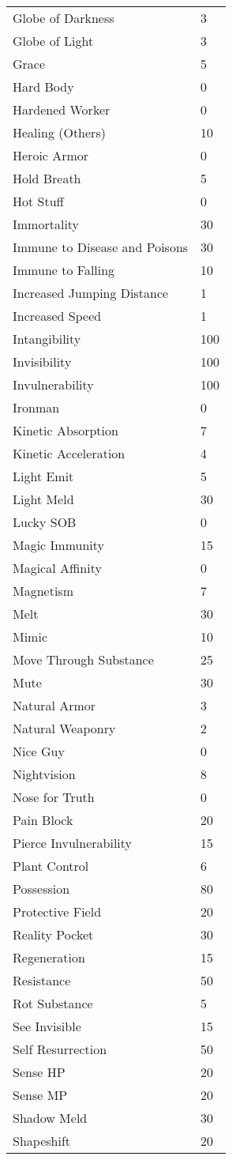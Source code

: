 \documentclass[twoside]{book}
\begin{document}
\begin{longtable}{p{1.25in}l}
      \raggedright  Globe of Darkness& 3\tabularnewline
      \raggedright  Globe of Light& 3\tabularnewline
      \raggedright  Grace& 5\tabularnewline
      \raggedright  Hard Body& 0\tabularnewline
      \raggedright  Hardened Worker& 0\tabularnewline
      \raggedright  Healing (Others)& 10\tabularnewline
      \raggedright  Heroic Armor& 0\tabularnewline
      \raggedright  Hold Breath& 5\tabularnewline
      \raggedright  Hot Stuff& 0\tabularnewline
      \raggedright  Immortality& 30\tabularnewline
      \raggedright  Immune to Disease and Poisons& 30\tabularnewline
      \raggedright  Immune to Falling& 10\tabularnewline
      \raggedright  Increased Jumping Distance& 1\tabularnewline
      \raggedright  Increased Speed& 1\tabularnewline
      \raggedright  Intangibility& 100\tabularnewline
      \raggedright  Invisibility& 100\tabularnewline
      \raggedright  Invulnerability& 100\tabularnewline
      \raggedright  Ironman& 0\tabularnewline
      \raggedright  Kinetic Absorption& 7\tabularnewline
      \raggedright  Kinetic Acceleration& 4\tabularnewline
      \raggedright  Light Emit& 5\tabularnewline
      \raggedright  Light Meld& 30\tabularnewline
      \raggedright  Lucky SOB& 0\tabularnewline
      \raggedright  Magic Immunity& 15\tabularnewline
      \raggedright  Magical Affinity& 0\tabularnewline
      \raggedright  Magnetism& 7\tabularnewline
      \raggedright  Melt& 30\tabularnewline
      \raggedright  Mimic& 10\tabularnewline
      \raggedright  Move Through Substance& 25\tabularnewline
      \raggedright  Mute& 30\tabularnewline
      \raggedright  Natural Armor& 3\tabularnewline
      \raggedright  Natural Weaponry& 2\tabularnewline
      \raggedright  Nice Guy& 0\tabularnewline
      \raggedright  Nightvision& 8\tabularnewline
      \raggedright  Nose for Truth& 0\tabularnewline
      \raggedright  Pain Block& 20\tabularnewline
      \raggedright  Pierce Invulnerability& 15\tabularnewline
      \raggedright  Plant Control& 6\tabularnewline
      \raggedright  Possession& 80\tabularnewline
      \raggedright  Protective Field& 20\tabularnewline
      \raggedright  Reality Pocket& 30\tabularnewline
      \raggedright  Regeneration& 15\tabularnewline
      \raggedright  Resistance& 50\tabularnewline
      \raggedright  Rot Substance& 5\tabularnewline
      \raggedright  See Invisible& 15\tabularnewline
      \raggedright  Self Resurrection& 50\tabularnewline
      \raggedright  Sense HP& 20\tabularnewline
      \raggedright  Sense MP& 20\tabularnewline
      \raggedright  Shadow Meld& 30\tabularnewline
      \raggedright  Shapeshift& 20\tabularnewline

\end{longtable}
\end{document}
